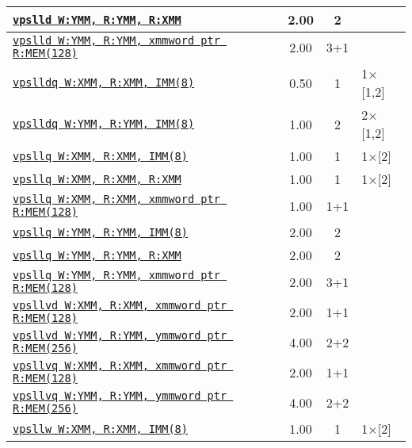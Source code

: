 \documentclass[a4paper,english,fontsize=9]{scrartcl}
\begin{document}
\begin{longtable}{p{}ccL{.25\textwidth}}
  \texttt{\href{https://felixcloutier.com/x86/PSLLW:PSLLD:PSLLQ.html}{vpslld W:YMM, R:YMM, R:XMM}} & 2.00 & 2 &  \\
  \midrule
  \texttt{\href{https://felixcloutier.com/x86/PSLLW:PSLLD:PSLLQ.html}{vpslld W:YMM, R:YMM, xmmword ptr R:MEM(128)}} & 2.00 & 3+1 &  \\
  \midrule
  \texttt{\href{https://felixcloutier.com/x86/PSLLDQ.html}{vpslldq W:XMM, R:XMM, IMM(8)}} & 0.50 & 1 & 1\(\times\)[1,2] \\
  \midrule
  \texttt{\href{https://felixcloutier.com/x86/PSLLDQ.html}{vpslldq W:YMM, R:YMM, IMM(8)}} & 1.00 & 2 & 2\(\times\)[1,2] \\
  \midrule
  \texttt{\href{https://felixcloutier.com/x86/PSLLW:PSLLD:PSLLQ.html}{vpsllq W:XMM, R:XMM, IMM(8)}} & 1.00 & 1 & 1\(\times\)[2] \\
  \midrule
  \texttt{\href{https://felixcloutier.com/x86/PSLLW:PSLLD:PSLLQ.html}{vpsllq W:XMM, R:XMM, R:XMM}} & 1.00 & 1 & 1\(\times\)[2] \\
  \midrule
  \texttt{\href{https://felixcloutier.com/x86/PSLLW:PSLLD:PSLLQ.html}{vpsllq W:XMM, R:XMM, xmmword ptr R:MEM(128)}} & 1.00 & 1+1 &  \\
  \midrule
  \texttt{\href{https://felixcloutier.com/x86/PSLLW:PSLLD:PSLLQ.html}{vpsllq W:YMM, R:YMM, IMM(8)}} & 2.00 & 2 &  \\
  \midrule
  \texttt{\href{https://felixcloutier.com/x86/PSLLW:PSLLD:PSLLQ.html}{vpsllq W:YMM, R:YMM, R:XMM}} & 2.00 & 2 &  \\
  \midrule
  \texttt{\href{https://felixcloutier.com/x86/PSLLW:PSLLD:PSLLQ.html}{vpsllq W:YMM, R:YMM, xmmword ptr R:MEM(128)}} & 2.00 & 3+1 &  \\
  \midrule
  \texttt{\href{https://felixcloutier.com/x86/VPSLLVW:VPSLLVD:VPSLLVQ.html}{vpsllvd W:XMM, R:XMM, xmmword ptr R:MEM(128)}} & 2.00 & 1+1 &  \\
  \midrule
  \texttt{\href{https://felixcloutier.com/x86/VPSLLVW:VPSLLVD:VPSLLVQ.html}{vpsllvd W:YMM, R:YMM, ymmword ptr R:MEM(256)}} & 4.00 & 2+2 &  \\
  \midrule
  \texttt{\href{https://felixcloutier.com/x86/VPSLLVW:VPSLLVD:VPSLLVQ.html}{vpsllvq W:XMM, R:XMM, xmmword ptr R:MEM(128)}} & 2.00 & 1+1 &  \\
  \midrule
  \texttt{\href{https://felixcloutier.com/x86/VPSLLVW:VPSLLVD:VPSLLVQ.html}{vpsllvq W:YMM, R:YMM, ymmword ptr R:MEM(256)}} & 4.00 & 2+2 &  \\
  \midrule
  \texttt{\href{https://felixcloutier.com/x86/PSLLW:PSLLD:PSLLQ.html}{vpsllw W:XMM, R:XMM, IMM(8)}} & 1.00 & 1 & 1\(\times\)[2] \\

\end{longtable}
\end{document}
